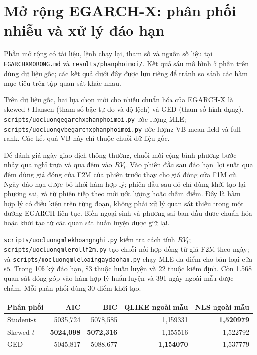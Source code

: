 \documentclass[11pt,a4paper]{article}
\renewcommand{\_}{\gachduoi\allowbreak}
\newcommand{\tep}[1]{\texttt{#1}}
\begin{document}
\section{Mở rộng EGARCH-X: phân phối nhiễu và xử lý đáo hạn}
Phần mở rộng có tài liệu, lệnh chạy lại, tham số và nguồn số liệu tại
\tep{EGARCH\_X\_MO\_RONG.md} và \tep{results/phan\_phoi\_moi/}.
Kết quả sáu mô hình ở phần trên dùng dữ liệu gốc; các kết quả dưới đây
được lưu riêng để tránh so sánh các hàm mục tiêu trên tập quan sát khác nhau.

Trên dữ liệu gốc, hai lựa chọn mới cho nhiễu chuẩn hóa của EGARCH-X là
skewed-$t$ Hansen (tham số bậc tự do và độ lệch) và GED (tham số hình dạng).
\tep{scripts/uoc\_luong\_egarch\_x\_phan\_phoi\_moi.py} ước lượng MLE;
\tep{scripts/uoc\_luong\_vb\_egarch\_x\_phan\_phoi\_moi.py} ước lượng
VB mean-field và full-rank. Các kết quả VB này chỉ thuộc chuỗi dữ liệu gốc.

Để đánh giá ngày giao dịch thông thường, chuỗi mới cộng bình phương bước
nhảy qua nghỉ trưa và qua đêm vào $RV_t$. Vào phiên đầu sau đáo hạn,
lợi suất qua đêm dùng giá đóng cửa F2M của phiên trước thay cho giá đóng cửa
F1M cũ. Ngày đáo hạn được bỏ khỏi hàm hợp lý; phiên đầu sau đó chỉ dùng
khởi tạo lại phương sai, và từ phiên tiếp theo mới ước lượng hoặc chấm điểm.
Đây là hàm hợp lý có điều kiện trên từng đoạn, không phải xử lý quan sát thiếu
trong một đường EGARCH liên tục. Biến ngoại sinh và phương sai ban đầu được
chuẩn hóa hoặc khởi tạo từ các quan sát huấn luyện được giữ lại.

\tep{scripts/uoc\_luong\_mle\_khoang\_nghi.py} kiểm tra cách tính $RV_t$;
\tep{scripts/uoc\_luong\_mle\_roll\_f2m.py} tạo chuỗi nối hợp đồng từ
giá F2M theo ngày; và
\tep{scripts/uoc\_luong\_mle\_loai\_ngay\_dao\_han.py} chạy MLE
đa điểm cho bản loại cửa sổ. Trong 105 kỳ đáo hạn, 83 thuộc huấn luyện
và 22 thuộc kiểm định. Còn 1.568 quan sát đóng góp vào hàm hợp lý huấn luyện
và 391 ngày ngoài mẫu được chấm. Mỗi phân phối dùng 30 điểm khởi tạo.

\begin{center}
\begin{tabular}{lrrrr}
\toprule
Phân phối & AIC & BIC & QLIKE ngoài mẫu & NLS ngoài mẫu \\
\midrule
Student-$t$ & 5035,724 & 5078,585 & 1,159331 & \textbf{1,520979} \\
Skewed-$t$ & \textbf{5024,098} & \textbf{5072,316} & 1,155516 & 1,522792 \\
GED & 5045,817 & 5088,677 & \textbf{1,154070} & 1,537779 \\
\bottomrule
\end{tabular}
\end{center}
\end{document}
